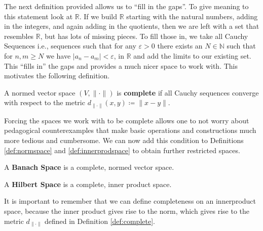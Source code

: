 The next definition provided allows us to ``fill in the gaps''. To give meaning to this statement look at $\mathbb{R}$. If we build $\mathbb{R}$ starting with the natural numbers, adding in the integers, and again adding in the quotients, then we are left with a set that resembles $\mathbb{R}$, but has lots of missing pieces. To fill those in, we take all Cauchy Sequences i.e., sequences such that for any $\varepsilon >0$ there exists an $N\in\mathbb{N}$ such that for $n,m\geq N$ we have $|a_n - a_m| < \varepsilon$, in $\mathbb{R}$ and add the limits to our existing set. This ``fills in'' the gaps and provides a much nicer space to work with. This motivates the following definition.
\begin{definition}\label{def:complete}
A normed vector space $(V, \|\cdot\|)$ is \textbf{complete} if all Cauchy sequences converge with respect to the metric $d_{\|\cdot\|}(x,y)\coloneqq\|x - y\|$.
\end{definition}
Forcing the spaces we work with to be complete allows one to not worry about pedagogical counterexamples that make basic operations and constructions much more tedious and cumbersome. We can now add this condition to Definitions \ref{def:normspace} and \ref{def:innerprodspace} to obtain further restricted spaces.
\begin{definition}\label{def:banach}
A \textbf{Banach Space} is a complete, normed vector space.
\end{definition}
\begin{definition}
A \textbf{Hilbert Space} is a complete, inner product space.
\end{definition}
It is important to remember that we can define completeness on an innerproduct space, because the inner product gives rise to the norm, which gives rise to the metric $d_{\|\cdot\|}$ defined in Definition \ref{def:complete}.

